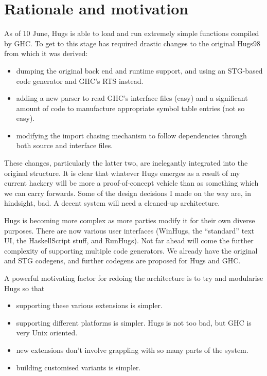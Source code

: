 \section{Rationale and motivation}
As of 10 June, Hugs is able to load and run
extremely simple functions compiled by GHC.  To get to this stage has
required drastic changes to the original Hugs98 from which it was
derived:
\begin{itemize}
\item dumping the original back end and runtime support, and using
  an STG-based code generator and GHC's RTS instead.
\item adding a new parser to read GHC's interface files (easy) and
  a significant amount of code to manufacture appropriate
  symbol table entries (not so easy).
\item modifying the import chasing mechanism to follow dependencies
  through both source and interface files.
\end{itemize}

These changes, particularly the latter two, are inelegantly integrated
into the original structure.  It is clear that whatever Hugs
emerges as a result of my current hackery will be more a
proof-of-concept vehicle than as something which we can carry
forwards.  Some of the design decisions I made on the way are, in
hindsight,  bad.  A decent system will need a cleaned-up
architecture.

Hugs is becoming more complex as more parties modify it for their own
diverse purposes.  There are now various user interfaces (WinHugs, the
``standard'' text UI, the HaskellScript stuff, and RunHugs).  Not far
ahead will come the further complexity of supporting multiple code
generators.  We already have the original and STG codegens, and 
further codegens are proposed for Hugs and GHC.

A powerful motivating factor for redoing the architecture is to try
and modularise Hugs so that
\begin{itemize}
\item supporting these various extensions is simpler.
\item supporting different platforms is simpler.  Hugs is not too
  bad, but GHC is very Unix oriented.
\item new extensions don't involve grappling with so many
  parts of the system.
\item building customised variants is simpler.
\end{itemize}

